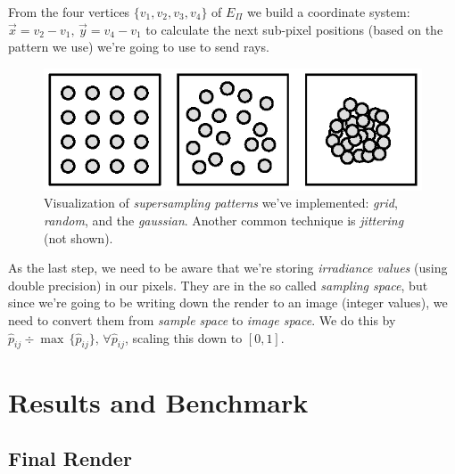 \documentclass[a4paper, twocolumn]{article}
\begin{document}
            From the four vertices \(\{v_1, v_2, v_3, v_4\}\) of \(E_\Pi\) we build a coordinate system: \(\vec{x} = v_2 - v_1,\, \vec{y} = v_4 - v_1\) to calculate the next sub-pixel positions (based on the pattern we use) we're going to use to send rays.

            \begin{figure}[ht]
                \centering
                \includegraphics[width=\linewidth]{share/sampling_methods.eps}
                \caption{Visualization of \emph{supersampling patterns} we've implemented: \emph{grid}, \emph{random}, and the \emph{gaussian}. Another common technique is \emph{jittering} (not shown).}
                \label{fig:sampling_methods}
            \end{figure}

            As the last step, we need to be aware that we're storing \emph{irradiance values} (using double precision) in our pixels. They are in the so called \emph{sampling space}, but since we're going to be writing down the render to an image (integer values), we need to convert them from \emph{sample space} to \emph{image space}. We do this by \(\hat{p}_{ij} \div \max\, \{\hat{p}_{ij}\},\, \forall \hat{p}_{ij}\), scaling this down to \([0,1]\).

    \section{Results and Benchmark} \label{sec:results_and_benchmark}

        \subsection*{Final Render}
\end{document}
